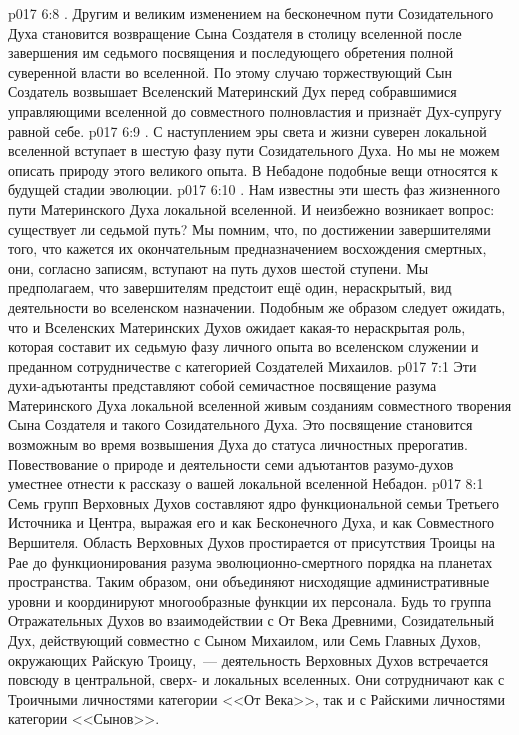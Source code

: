 \vs p017 6:8 . Другим и великим изменением на бесконечном пути Созидательного Духа становится возвращение Сына Создателя в столицу вселенной после завершения им седьмого посвящения и последующего обретения полной суверенной власти во вселенной. По этому случаю торжествующий Сын Создатель возвышает Вселенский Материнский Дух перед собравшимися управляющими вселенной до совместного полновластия и признаёт Дух\hyp{}супругу равной себе.
\vs p017 6:9 . С наступлением эры света и жизни суверен локальной вселенной вступает в шестую фазу пути Созидательного Духа. Но мы не можем описать природу этого великого опыта. В Небадоне подобные вещи относятся к будущей стадии эволюции.
\vs p017 6:10 . Нам известны эти шесть фаз жизненного пути Материнского Духа локальной вселенной. И неизбежно возникает вопрос: существует ли седьмой путь? Мы помним, что, по достижении завершителями того, что кажется их окончательным предназначением восхождения смертных, они, согласно записям, вступают на путь духов шестой ступени. Мы предполагаем, что завершителям предстоит ещё один, нераскрытый, вид деятельности во вселенском назначении. Подобным же образом следует ожидать, что и Вселенских Материнских Духов ожидает какая\hyp{}то нераскрытая роль, которая составит их седьмую фазу личного опыта во вселенском служении и преданном сотрудничестве с категорией Создателей Михаилов.
\vs p017 7:1 Эти духи\hyp{}адъютанты представляют собой семичастное посвящение разума Материнского Духа локальной вселенной живым созданиям совместного творения Сына Создателя и такого Созидательного Духа. Это посвящение становится возможным во время возвышения Духа до статуса личностных прерогатив. Повествование о природе и деятельности семи адъютантов разумо\hyp{}духов уместнее отнести к рассказу о вашей локальной вселенной Небадон.
\vs p017 8:1 Семь групп Верховных Духов составляют ядро функциональной семьи Третьего Источника и Центра, выражая его и как Бесконечного Духа, и как Совместного Вершителя. Область Верховных Духов простирается от присутствия Троицы на Рае до функционирования разума эволюционно\hyp{}смертного порядка на планетах пространства. Таким образом, они объединяют нисходящие административные уровни и координируют многообразные функции их персонала. Будь то группа Отражательных Духов во взаимодействии с От Века Древними, Созидательный Дух, действующий совместно с Сыном Михаилом, или Семь Главных Духов, окружающих Райскую Троицу,~--- деятельность Верховных Духов встречается повсюду в центральной, сверх\hyp{} и локальных вселенных. Они сотрудничают как с Троичными личностями категории <<От Века>>, так и с Райскими личностями категории <<Сынов>>.

